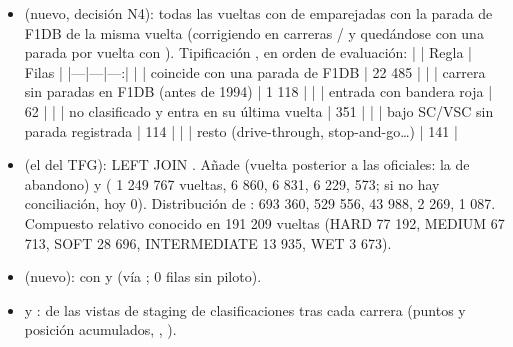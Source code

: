 \begin{itemize}
\item \textbf{} (nuevo, decisión N4): todas las vueltas con  de  emparejadas con la parada de F1DB de la misma vuelta (corrigiendo  en carreras / y quedándose con una parada por vuelta con ). Tipificación , en orden de evaluación: |  | Regla | Filas | |---|---|---:| |  | coincide con una parada de F1DB | 22 485 | |  | carrera sin paradas en F1DB (antes de 1994) | 1 118 | |  | entrada con bandera roja | 62 | |  | no clasificado y entra en su última vuelta | 351 | |  | bajo SC/VSC sin parada registrada | 114 | |  | resto (drive-through, stop-and-go…) | 141 |
\item \textbf{} (el  del TFG):   LEFT JOIN  . Añade  (vuelta posterior a las oficiales: la de abandono) y  ( 1 249 767 vueltas,  6 860,  6 831,  6 229,  573;  si no hay conciliación, hoy 0). Distribución de :  693 360,  529 556,  43 988,  2 269,  1 087. Compuesto relativo conocido en 191 209 vueltas (HARD 77 192, MEDIUM 67 713, SOFT 28 696, INTERMEDIATE 13 935, WET 3 673).
\item \textbf{} (nuevo):  con  y  (vía ; 0 filas sin piloto).
\item \textbf{} y \textbf{}:  de las vistas de staging de clasificaciones tras cada carrera (puntos y posición acumulados, , ).
\end{itemize}


